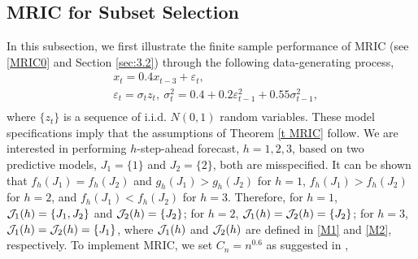 \documentclass[ejsv2]{imsart}
\theoremstyle{plain}
\theoremstyle{definition}
\theoremstyle{remark}
\begin{document}

\subsection{MRIC for Subset Selection}\label{sec:4.2}
In this subsection, we first illustrate the finite sample performance of MRIC (see \eqref{MRIC0} and Section \ref{sec:3.2})
through the following data-generating process,
\begin{equation*}
\begin{split}
\label{ing137}
     & x_t=0.4x_{t-3}+\varepsilon_t, \\
     & \varepsilon_t=\sigma_tz_t,\ \sigma_t^2=0.4+0.2\varepsilon_{t-1}^2+0.55\sigma_{t-1}^2,  \\
\end{split}
\end{equation*}
where $\{z_t\}$ is a sequence of i.i.d. $N(0,1)$ random variables.
These model specifications imply that
the assumptions of Theorem \ref{t MRIC} follow.
We are interested in performing $h$-step-ahead forecast, $h=1, 2, 3$,
based on two predictive models, $J_1=\{1\}$ and $J_2=\{2\}$, both are misspecified.
It can be shown that
$f_h(J_1)=f_h(J_2)$ and $g_h(J_1)>g_h(J_2)$ for $h=1$, $f_h(J_1)>f_h(J_2)$ for $h=2$, and
$f_h(J_1)<f_h(J_2)$ for $h=3$.
Therefore, for $h=1$, ${\cal J}_{1}(h)=\{J_1, J_2\}$ and ${\cal J}_{2}(h)=\{J_2\}$;
for $h=2$, ${\cal J}_{1}(h)={\cal J}_{2}(h)=\{J_2\}$;
for $h=3$, ${\cal J}_{1}(h)={\cal J}_{2}(h)=\{J_1\}$,
where ${\cal J}_{1}(h)$
and ${\cal J}_{2}(h)$
are defined in \eqref{M1}
and \eqref{M2}, respectively.
To implement MRIC,
we set $C_n=n^{0.6}$ as suggested in \cite{Hsu2019},
\end{document}
